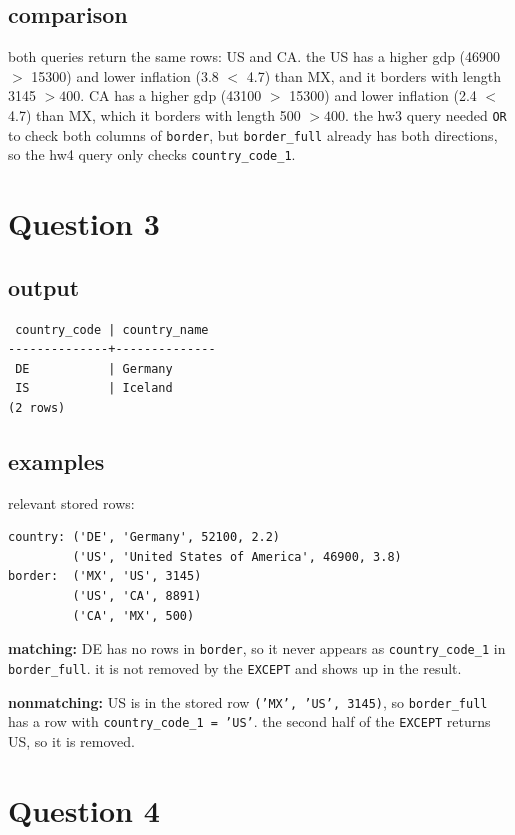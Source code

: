 \documentclass[11pt]{article}
\begin{document}
\subsection*{comparison}
both queries return the same rows: US and CA. the US has a higher gdp (46900 $>$ 15300) and
lower inflation (3.8 $<$ 4.7) than MX, and it borders with length 3145 $> 400$.
CA has a higher gdp (43100 $>$ 15300) and lower inflation (2.4 $<$ 4.7) than MX, which it
borders with length 500 $> 400$. the hw3 query needed \texttt{OR} to check both columns of
\texttt{border}, but \texttt{border\_full} already has both directions, so the hw4 query only
checks \texttt{country\_code\_1}.

\section*{Question 3}

\subsection*{output}
{\small
\begin{verbatim}
 country_code | country_name
--------------+--------------
 DE           | Germany
 IS           | Iceland
(2 rows)
\end{verbatim}
}

\subsection*{examples}
relevant stored rows:
{\small
\begin{verbatim}
country: ('DE', 'Germany', 52100, 2.2)
         ('US', 'United States of America', 46900, 3.8)
border:  ('MX', 'US', 3145)
         ('US', 'CA', 8891)
         ('CA', 'MX', 500)
\end{verbatim}
}

\noindent\textbf{matching:} DE has no rows in \texttt{border}, so it never appears as
\texttt{country\_code\_1} in \texttt{border\_full}. it is not removed by the \texttt{EXCEPT}
and shows up in the result.

\noindent\textbf{nonmatching:} US is in the stored row
\texttt{('MX', 'US', 3145)}, so \texttt{border\_full} has a row with \texttt{country\_code\_1 = 'US'}.
the second half of the \texttt{EXCEPT} returns US, so it is removed.

\section*{Question 4}
\end{document}
